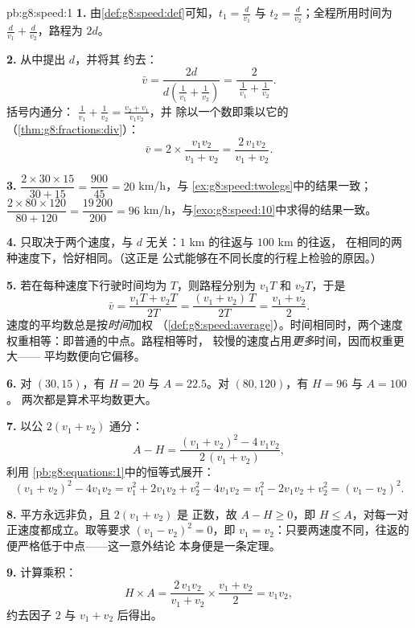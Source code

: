\begin{solution}{pb:g8:speed:1}
\textbf{1.} 由\cref{def:g8:speed:def}可知，$t_1 = \frac{d}{v_1}$ 与
$t_2 = \frac{d}{v_2}$；全程所用时间为
$\frac{d}{v_1} + \frac{d}{v_2}$，路程为 $2d$。

\textbf{2.} 从中提出 $d$，并将其
约去：
\[
\bar v
= \frac{2d}{d\left(\frac{1}{v_1} + \frac{1}{v_2}\right)}
= \frac{2}{\ \frac{1}{v_1} + \frac{1}{v_2}\ } .
\]
括号内通分：
$\frac{1}{v_1} + \frac{1}{v_2} = \frac{v_2 + v_1}{v_1 v_2}$，并
除以一个数即乘以它的
（\cref{thm:g8:fractions:div}）：
\[
\bar v = 2 \times \frac{v_1 v_2}{v_1 + v_2}
= \frac{2\, v_1 v_2}{v_1 + v_2} .
\]

\textbf{3.} $\dfrac{2 \times 30 \times 15}{30 + 15}
= \dfrac{900}{45} = 20$ km/h，与
\cref{ex:g8:speed:twolegs}中的结果一致；
$\dfrac{2 \times 80 \times 120}{80 + 120} = \dfrac{19\,200}{200}
= 96$ km/h，与\cref{exo:g8:speed:10}中求得的结果一致。

\textbf{4.} 只取决于两个速度，与
$d$ 无关：$1$ km 的往返与 $100$ km 的往返，
在相同的两种速度下，恰好相同。（这正是
公式能够在不同长度的行程上检验的原因。）

\textbf{5.} 若在每种速度下行驶时间均为 $T$，则路程分别为 $v_1 T$
和 $v_2 T$，于是
\[
\bar v = \frac{v_1 T + v_2 T}{2T}
= \frac{(v_1 + v_2)\,T}{2T}
= \frac{v_1 + v_2}{2} .
\]
速度的平均数总是按\emph{时间}加权
（\cref{def:g8:speed:average}）。时间相同时，两个速度
权重相等：即普通的中点。路程相等时，
较慢的速度占用\emph{更多}时间，因而权重更大——
平均数便向它偏移。

\textbf{6.} 对 $(30, 15)$，有 $H = 20$ 与 $A = 22.5$。对
$(80, 120)$，有 $H = 96$ 与 $A = 100$。
两次都是算术平均数更大。

\textbf{7.} 以公 $2(v_1 + v_2)$ 通分：
\[
A - H
= \frac{(v_1 + v_2)^2 - 4\, v_1 v_2}{2\,(v_1 + v_2)} ,
\]
利用
\cref{pb:g8:equations:1}中的恒等式展开：
\[
(v_1 + v_2)^2 - 4 v_1 v_2
= v_1^2 + 2 v_1 v_2 + v_2^2 - 4 v_1 v_2
= v_1^2 - 2 v_1 v_2 + v_2^2
= (v_1 - v_2)^2 .
\]

\textbf{8.} 平方永远非负，且 $2(v_1 + v_2)$ 是
正数，故 $A - H \geq 0$，即 $H \leq A$，对每一对
正速度都成立。取等要求 $(v_1 - v_2)^2 = 0$，即
$v_1 = v_2$：只要两速度不同，往返的
便严格低于中点——这一意外结论
本身便是一条定理。

\textbf{9.} 计算乘积：
\[
H \times A
= \frac{2\, v_1 v_2}{v_1 + v_2} \times \frac{v_1 + v_2}{2}
= v_1 v_2 ,
\]
约去因子 $2$ 与 $v_1 + v_2$ 后得出。


\end{solution}

